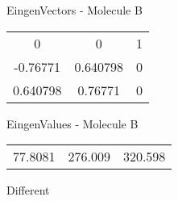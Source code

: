 \begin{multicols}{2}
\begin{center}
\vtab
 EingenVectors - Molecule B     \\
\vtab
\begin{tabular}{|c c c|}
0	 & 	0	 & 	1	 \\
-0.76771	 & 	0.640798	 & 	0	 \\
0.640798	 & 	0.76771	 & 	0
\end{tabular}

\vtab
 EingenValues - Molecule B     \\
\vtab
\begin{tabular}{|c c c|}
77.8081	 & 	276.009	 & 	320.598	 \\
\end{tabular}

\end{center}
\end{multicols}
\begin{center}
\vtab
\vtab
\textcolor{NavyBlue}{\Large Different}
\end{center}

 \newpage

